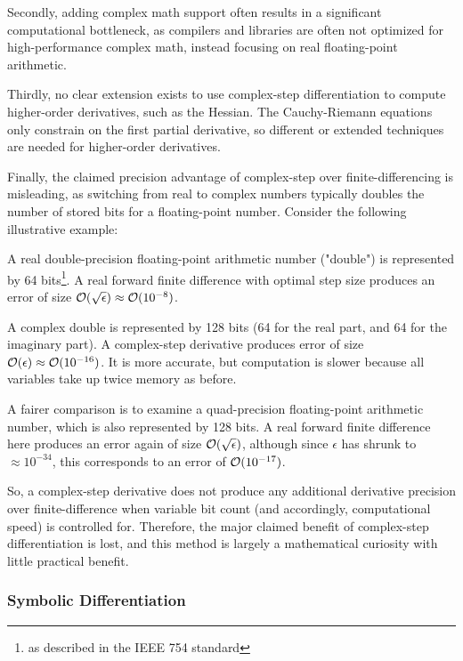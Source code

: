 Secondly, adding complex math support often results in a significant computational bottleneck, as compilers and libraries are often not optimized for high-performance complex math, instead focusing on real floating-point arithmetic.

Thirdly, no clear extension exists to use complex-step differentiation to compute higher-order derivatives, such as the Hessian. The Cauchy-Riemann equations only constrain on the first partial derivative, so different or extended techniques are needed for higher-order derivatives.

Finally, the claimed precision advantage of complex-step over finite-differencing is misleading, as switching from real to complex numbers typically doubles the number of stored bits for a floating-point number. Consider the following illustrative example:



\begin{example}
    A real double-precision floating-point arithmetic number ("double") is represented by 64 bits\footnote{as described in the IEEE 754 standard}. A real forward finite difference with optimal step size produces an error of size $\mathcal{O}(\sqrt{\epsilon}) \approx \mathcal{O}(10^{-8})$.

    A complex double is represented by 128 bits (64 for the real part, and 64 for the imaginary part). A complex-step derivative produces error of size $\mathcal{O}(\epsilon) \approx \mathcal{O}(10^{-16})$. It is more accurate, but computation is slower because all variables take up twice memory as before.

    A fairer comparison is to examine a quad-precision floating-point arithmetic number, which is also represented by 128 bits. A real forward finite difference here produces an error again of size $\mathcal{O}(\sqrt{\epsilon})$, although since $\epsilon$ has shrunk to $\approx 10^{-34}$, this corresponds to an error of $\mathcal{O}(10^{-17})$.
\end{example}

So, a complex-step derivative does not produce any additional derivative precision over finite-difference when variable bit count (and accordingly, computational speed) is controlled for. Therefore, the major claimed benefit of complex-step differentiation is lost, and this method is largely a mathematical curiosity with little practical benefit.

\subsubsection{Symbolic Differentiation}

